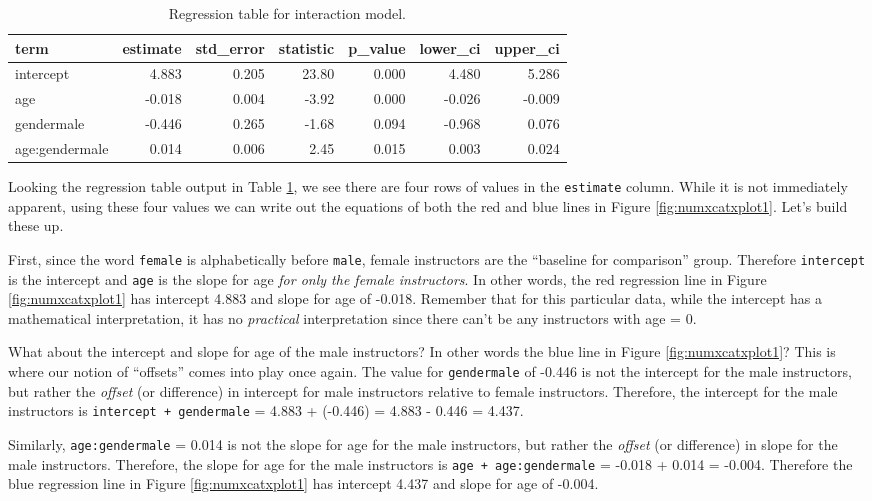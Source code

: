 \documentclass[12pt, krantz2,]{krantz}
\begin{document}
\begin{table}[H]

\caption{\label{tab:regtable-interaction}Regression table for interaction model.}
\centering
\fontsize{10}{12}\selectfont
\begin{tabular}{lrrrrrr}
\toprule
term & estimate & std\_error & statistic & p\_value & lower\_ci & upper\_ci\\
\midrule
intercept & 4.883 & 0.205 & 23.80 & 0.000 & 4.480 & 5.286\\
age & -0.018 & 0.004 & -3.92 & 0.000 & -0.026 & -0.009\\
gendermale & -0.446 & 0.265 & -1.68 & 0.094 & -0.968 & 0.076\\
age:gendermale & 0.014 & 0.006 & 2.45 & 0.015 & 0.003 & 0.024\\
\bottomrule
\end{tabular}
\end{table}

Looking the regression table output in Table \ref{tab:regtable-interaction}, we see there are four rows of values in the \texttt{estimate} column. While it is not immediately apparent, using these four values we can write out the equations of both the red and blue lines in Figure \ref{fig:numxcatxplot1}. Let's build these up.

First, since the word \texttt{female} is alphabetically before \texttt{male}, female instructors are the ``baseline for comparison'' group. Therefore \texttt{intercept} is the intercept and \texttt{age} is the slope for age \emph{for only the female instructors}. In other words, the red regression line in Figure \ref{fig:numxcatxplot1} has intercept 4.883 and slope for age of -0.018. Remember that for this particular data, while the intercept has a mathematical interpretation, it has no \emph{practical} interpretation since there can't be any instructors with age = 0.

What about the intercept and slope for age of the male instructors? In other words the blue line in Figure \ref{fig:numxcatxplot1}? This is where our notion of ``offsets'' comes into play once again. The value for \texttt{gendermale} of -0.446 is not the intercept for the male instructors, but rather the \emph{offset} (or difference) in intercept for male instructors relative to female instructors. Therefore, the intercept for the male instructors is \texttt{intercept\ +\ gendermale} = 4.883 + (-0.446) = 4.883 - 0.446 = 4.437.

Similarly, \texttt{age:gendermale} = 0.014 is not the slope for age for the male instructors, but rather the \emph{offset} (or difference) in slope for the male instructors. Therefore, the slope for age for the male instructors is \texttt{age\ +\ age:gendermale} = -0.018 + 0.014 = -0.004. Therefore the blue regression line in Figure \ref{fig:numxcatxplot1} has intercept 4.437 and slope for age of -0.004.
\end{document}
